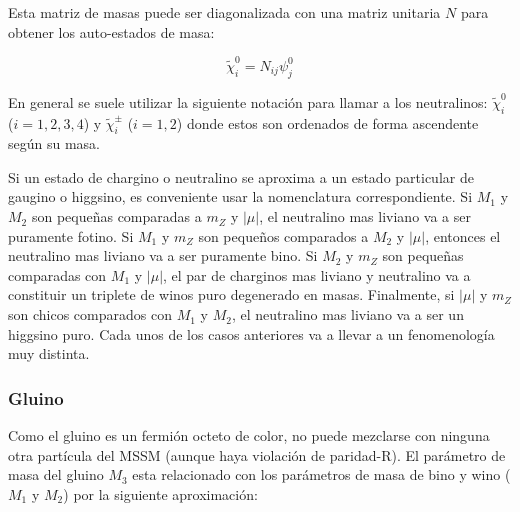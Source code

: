 Esta matriz de masas puede ser diagonalizada con una matriz unitaria
$N$ para obtener los auto-estados de masa:

\begin{equation}
  \tilde{\chi}^0_i = N_{ij} \psi^0_j
\end{equation}

En general se suele utilizar la siguiente notación para llamar a los
neutralinos: $\tilde{\chi}^0_{i}$ ($i=1,2,3,4$) y $\tilde{\chi}^{\pm}_{i}$ ($i=1,2$)
donde estos son ordenados de forma ascendente según su masa.







Si un estado de chargino o neutralino se aproxima a un estado
particular de gaugino o higgsino, es conveniente usar la nomenclatura
correspondiente. Si $M_1$ y $M_2$ son pequeñas comparadas a $m_Z$ y
$|\mu|$, el neutralino mas liviano va a ser puramente fotino. Si $M_1$
y $m_Z$ son pequeños comparados a $M_2$ y $|\mu|$, entonces el
neutralino mas liviano va a ser puramente bino. Si $M_2$ y $m_Z$ son
pequeñas comparadas con $M_1$ y $|\mu|$, el par de charginos mas
liviano y neutralino va a constituir un triplete de winos puro
degenerado en masas. Finalmente, si $|\mu|$ y $m_Z$ son chicos
comparados con $M_1$ y $M_2$, el neutralino mas liviano va a ser un
higgsino puro. Cada unos de los casos anteriores va a llevar a un
fenomenología muy distinta.


\subsubsection{Gluino}

Como el gluino es un fermión octeto de color, no puede mezclarse con
ninguna otra partícula del MSSM (aunque haya violación de paridad-R).
El parámetro de masa del gluino $M_3$ esta relacionado con los
parámetros de masa de bino y wino ($M_1$ y $M_2$) por la siguiente
aproximación:

